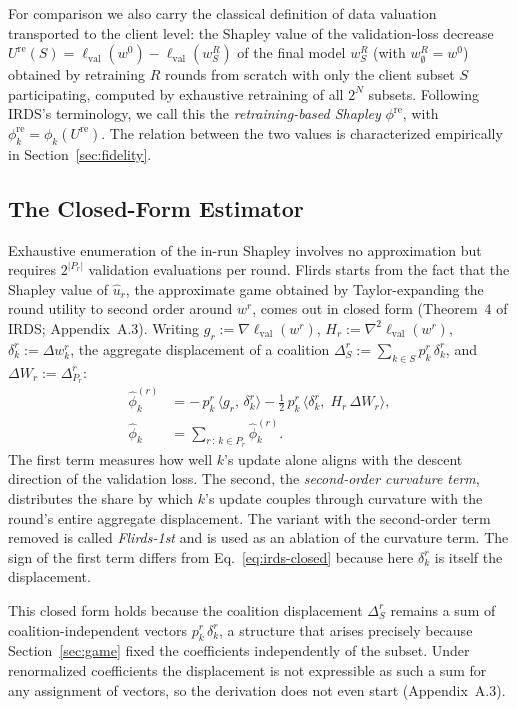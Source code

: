 \documentclass[letterpaper]{article} %
\theoremstyle{definition} %
\newcommand{\lval}{\ell_{\mathrm{val}}} %
\begin{document}
For comparison we also carry the classical definition of data valuation
transported to the client level: the Shapley value of the validation-loss
decrease $U^{\mathrm{re}}(S) = \lval(w^0) - \lval(w_S^R)$ of the final model
$w_S^R$ (with $w_\emptyset^R = w^0$) obtained by retraining $R$ rounds from
scratch with only the client subset $S$ participating, computed by exhaustive
retraining of all $2^N$ subsets. Following IRDS's terminology, we call this
the \emph{retraining-based Shapley} $\phi^{\mathrm{re}}$, with
$\phi_k^{\mathrm{re}} = \phi_k(U^{\mathrm{re}})$. The relation between the two
values is characterized empirically in Section~\ref{sec:fidelity}.

\subsection{The Closed-Form Estimator}
\label{sec:estimator}

Exhaustive enumeration of the in-run Shapley involves no approximation but
requires $2^{|P_r|}$ validation evaluations per round. Flirds starts from the
fact that the Shapley value of $\hat u_r$, the approximate game obtained by
Taylor-expanding the round utility to second order around $w^r$, comes out in
closed form (Theorem~4 of IRDS; Appendix~A.3). Writing
$g_r := \nabla \lval(w^r)$, $H_r := \nabla^2 \lval(w^r)$,
$\delta_k^r := \Delta w_k^r$, the aggregate displacement of a coalition
$\Delta_S^r := \sum_{k \in S} p_k^r\, \delta_k^r$, and
$\Delta W_r := \Delta_{P_r}^r$:
\begin{equation}\label{eq:closed}
\begin{split}
\hat\phi_k^{(r)}
&= -\,p_k^r\, \big\langle g_r,\, \delta_k^r \big\rangle
- \tfrac{1}{2}\, p_k^r\, \big\langle \delta_k^r,\; H_r\, \Delta W_r
\big\rangle, \\
\hat\phi_k &= \sum_{r\,:\,k\in P_r} \hat\phi_k^{(r)}.
\end{split}
\end{equation}
The first term measures how well $k$'s update alone aligns with the descent
direction of the validation loss. The second, the \emph{second-order
curvature term}, distributes the share by which $k$'s update couples through
curvature with the round's entire aggregate displacement. The variant with the
second-order term removed is called \emph{Flirds-1st} and is used as an
ablation of the curvature term. The sign of the first term differs
from Eq.~\eqref{eq:irds-closed} because here $\delta_k^r$ is itself the
displacement.

This closed form holds because the coalition displacement $\Delta_S^r$ remains
a sum of coalition-independent vectors $p_k^r\,\delta_k^r$, a structure that
arises precisely because Section~\ref{sec:game} fixed the coefficients
independently of the subset. Under renormalized coefficients the displacement
is not expressible as such a sum for any assignment of vectors, so the
derivation does not even start (Appendix~A.3).
\end{document}
